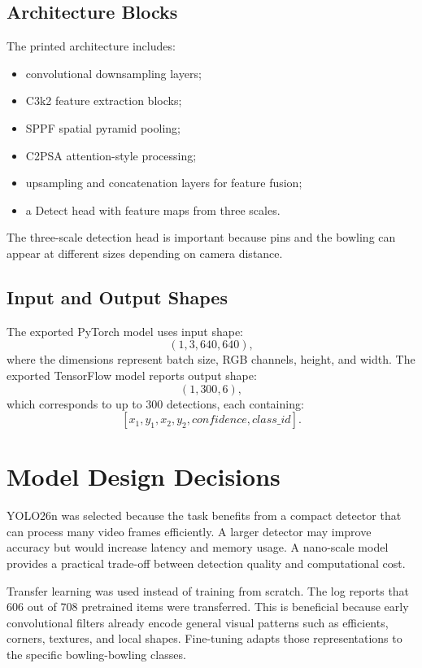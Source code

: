 \documentclass[12pt,a4paper]{article}
\begin{document}
\subsection{Architecture Blocks}

The printed architecture includes:
\begin{itemize}[noitemsep]
    \item convolutional downsampling layers;
    \item C3k2 feature extraction blocks;
    \item SPPF spatial pyramid pooling;
    \item C2PSA attention-style processing;
    \item upsampling and concatenation layers for feature fusion;
    \item a Detect head with feature maps from three scales.
\end{itemize}

The three-scale detection head is important because pins and the bowling can appear at different sizes depending on camera distance.

\subsection{Input and Output Shapes}

The exported PyTorch model uses input shape:
\[
(1,3,640,640),
\]
where the dimensions represent batch size, RGB channels, height, and width. The exported TensorFlow model reports output shape:
\[
(1,300,6),
\]
which corresponds to up to 300 detections, each containing:
\[
[x_1, y_1, x_2, y_2, confidence, class\_id].
\]

\section{Model Design Decisions}

YOLO26n was selected because the task benefits from a compact detector that can process many video frames efficiently. A larger detector may improve accuracy but would increase latency and memory usage. A nano-scale model provides a practical trade-off between detection quality and computational cost.

Transfer learning was used instead of training from scratch. The log reports that 606 out of 708 pretrained items were transferred. This is beneficial because early convolutional filters already encode general visual patterns such as efficients, corners, textures, and local shapes. Fine-tuning adapts those representations to the specific bowling-bowling classes.
\end{document}
